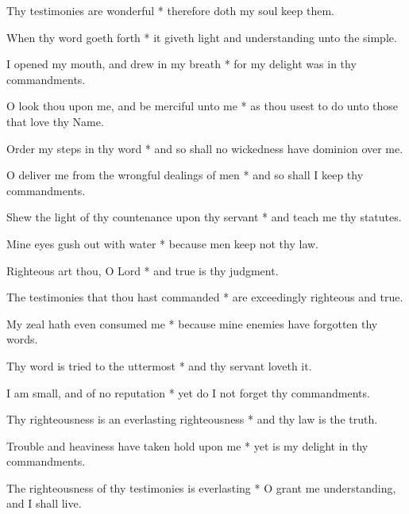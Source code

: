 Thy testimonies are wonderful * therefore doth my soul keep them.

When thy word goeth forth * it giveth light and understanding unto the simple.

I opened my mouth, and drew in my breath * for my delight was in thy commandments.

O look thou upon me, and be merciful unto me * as thou usest to do unto those that love thy Name.

Order my steps in thy word * and so shall no wickedness have dominion over me.

O deliver me from the wrongful dealings of men * and so shall I keep thy commandments.

Shew the light of thy countenance upon thy servant * and teach me thy statutes.

Mine eyes gush out with water * because men keep not thy law.

Righteous art thou, O Lord * and true is thy judgment.

The testimonies that thou hast commanded * are exceedingly righteous and true.

My zeal hath even consumed me * because mine enemies have forgotten thy words.

Thy word is tried to the uttermost * and thy servant loveth it.

I am small, and of no reputation * yet do I not forget thy commandments.

Thy righteousness is an everlasting righteousness * and thy law is the truth.

Trouble and heaviness have taken hold upon me * yet is my delight in thy commandments.

The righteousness of thy testimonies is everlasting * O grant me understanding, and I shall live.